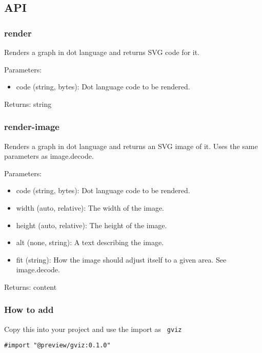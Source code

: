 \subsection{API}\label{api}

\subsubsection{render}\label{render}

Renders a graph in dot language and returns SVG code for it.

Parameters:

\begin{itemize}
\tightlist
\item
  code (string, bytes): Dot language code to be rendered.
\end{itemize}

Returns: string

\subsubsection{render-image}\label{render-image}

Renders a graph in dot language and returns an SVG image of it. Uses the
same parameters as image.decode.

Parameters:

\begin{itemize}
\tightlist
\item
  code (string, bytes): Dot language code to be rendered.
\item
  width (auto, relative): The width of the image.
\item
  height (auto, relative): The height of the image.
\item
  alt (none, string): A text describing the image.
\item
  fit (string): How the image should adjust itself to a given area. See
  image.decode.
\end{itemize}

Returns: content

\subsubsection{How to add}\label{how-to-add}

Copy this into your project and use the import as \texttt{\ gviz\ }

\begin{verbatim}
#import "@preview/gviz:0.1.0"
\end{verbatim}

